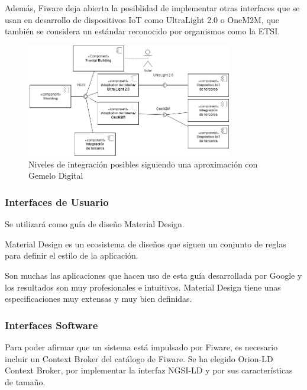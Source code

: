 \documentclass[12pt, a4paper, twoside]{article}
\begin{document}
Además, Fiware deja abierta la posiblidad de implementar otras interfaces que se usan en desarrollo de dispositivos
IoT como UltraLight 2.0 o OneM2M, que también se considera un estándar reconocido por organismos
como la ETSI.

\begin{figure}[h]
  \centering
  \includegraphics[width=0.8\textwidth]{IBuildingGenericComponents.1.1.png}
  \caption{Niveles de integración posibles siguiendo una aproximación con Gemelo Digital}
\end{figure}

\subsubsection{Interfaces de Usuario}
Se utilizará como guía de diseño Material Design.

Material Design es un ecosistema de diseños que siguen un conjunto de reglas para
definir el estilo de la aplicación. 

Son muchas las aplicaciones que hacen uso de esta guía desarrollada por Google y los resultados
son muy profesionales e intuitivos.
Material Design tiene unas especificaciones muy extensas y muy bien definidas. 

\subsubsection{Interfaces Software}
Para poder afirmar que un sistema está impulsado por Fiware, es necesario incluir un Context Broker del catálogo de Fiware.
Se ha elegido Orion-LD Context Broker, por implementar la interfaz NGSI-LD y por sus características de tamaño.
\end{document}

